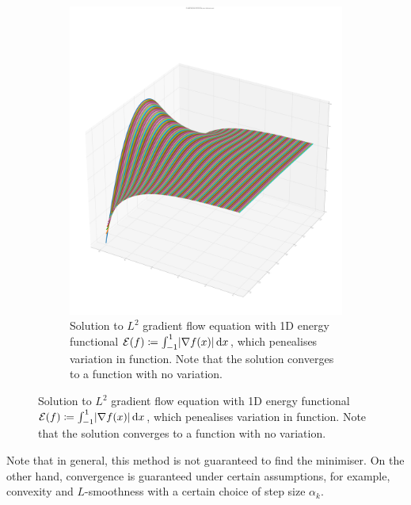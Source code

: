 \documentclass[../dissertation.tex]{subfiles}
\begin{document}
\begin{figure}[tbp]
\begin{subfigure}[b]{0.4\textwidth}
        \includegraphics[width=\textwidth]{sections/gradientFlowImgs/gf}
        \caption{Solution to $L^2$ gradient flow equation with 1D energy functional $\mathcal{E} (f) \coloneqq \int_{-1}^1 \lvert\nabla f(x)\lvert \, \text{d} x$, which penealises variation in function. Note that the solution converges to a function with no variation.}
        \label{fig: GF}
    \end{subfigure}
\end{figure}
Note that in general, this method is not guaranteed to find the minimiser.
On the other hand, convergence is guaranteed under certain assumptions, for example, convexity and $L$-smoothness with a certain choice of step size $\alpha_k$.
\end{document}
